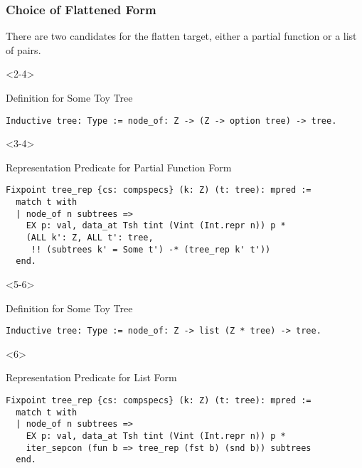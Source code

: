\documentclass{beamer}
\begin{document}
\begin{frame}[t,fragile]
\frametitle{Choice of Flattened Form}

There are two candidates for the flatten target, either a partial function or a
list of pairs.

\begin{onlyenv}<2-4>
  \begin{block}{Definition for Some Toy Tree}
\begin{verbatim}
Inductive tree: Type := node_of: Z -> (Z -> option tree) -> tree.
\end{verbatim}
  \end{block}
\end{onlyenv}

\begin{onlyenv}<3-4>
  \begin{alertblock}{Representation Predicate for Partial Function Form}
\begin{verbatim}
Fixpoint tree_rep {cs: compspecs} (k: Z) (t: tree): mpred :=
  match t with
  | node_of n subtrees =>
    EX p: val, data_at Tsh tint (Vint (Int.repr n)) p *
    (ALL k': Z, ALL t': tree,
     !! (subtrees k' = Some t') -* (tree_rep k' t'))
  end.
\end{verbatim}
  \end{alertblock}
\end{onlyenv}


\begin{onlyenv}<5-6>
  \begin{block}{Definition for Some Toy Tree}
\begin{verbatim}
Inductive tree: Type := node_of: Z -> list (Z * tree) -> tree.
\end{verbatim}
  \end{block}
\end{onlyenv}

\begin{onlyenv}<6>
  \begin{block}{Representation Predicate for List Form}
\begin{verbatim}
Fixpoint tree_rep {cs: compspecs} (k: Z) (t: tree): mpred :=
  match t with
  | node_of n subtrees =>
    EX p: val, data_at Tsh tint (Vint (Int.repr n)) p *
    iter_sepcon (fun b => tree_rep (fst b) (snd b)) subtrees
  end.
\end{verbatim}
  \end{block}
\end{onlyenv}

\end{frame}
\end{document}
